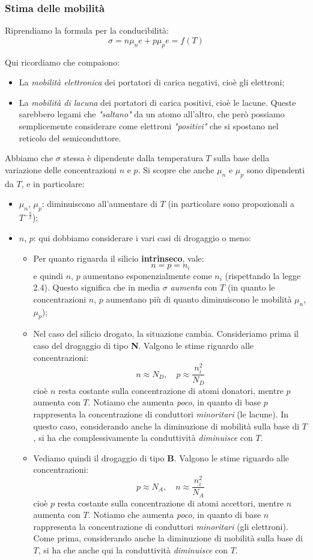 \documentclass[a4paper,11pt]{article}
\begin{document}
\subsubsection{Stima delle mobilità}
Riprendiamo la formula per la conducibilità:
$$
\sigma = n \mu_n e + p \mu_p e = f(T)
$$

Qui ricordiamo che compaiono:
\begin{itemize}
	\item La \textit{mobilità elettronica} dei portatori di carica negativi, cioè gli elettroni;
	\item La \textit{mobilità di lacuna} dei portatori di carica positivi, cioè le lacune. Queste sarebbero legami che \textit{"saltano"} da un atomo all'altro, che però possiamo semplicemente considerare come elettroni \textit{"positivi"} che si spostano nel reticolo del semiconduttore.
\end{itemize}

Abbiamo che $\sigma$ stessa è dipendente dalla temperatura $T$ sulla base della variazione delle concentrazioni $n$ e $p$. Si scopre che anche $\mu_n$ e $\mu_p$ sono dipendenti da $T$, e in particolare:
\begin{itemize}
	\item $\mu_n$, $\mu_p$: diminuiscono all'aumentare di $T$ (in particolare sono propozionali a $T^{-\frac{3}{2}}$);
	\item $n$, $p$: qui dobbiamo considerare i vari casi di drogaggio o meno:
		\begin{itemize}
			\item Per quanto riguarda il silicio \textbf{intrinseco}, vale:
				$$
					n = p = n_i
				$$
				e quindi $n$, $p$ aumentano esponenzialmente come $n_i$ (rispettando la legge 2.4). Questo significa che in media $\sigma$ \textit{aumenta} con $T$ (in quanto le concentrazioni $n$, $p$ aumentano più di quanto diminuiscono le mobilità $\mu_n$, $\mu_p$);
			\item Nel caso del silicio drogato, la situazione cambia. Consideriamo prima il caso del drogaggio di tipo \textbf{N}. Valgono le stime riguardo alle concentrazioni:
				$$
				n \approx N_D, \quad p \approx \frac{n_i^2}{N_D}
				$$
				cioè $n$ resta costante sulla concentrazione di atomi donatori, mentre $p$ aumenta con $T$. Notiamo che aumenta \textit{poco}, in quanto di base $p$ rappresenta la concentrazione di conduttori \textit{minoritari} (le lacune). In questo caso, considerando anche la diminuzione di mobilità sulla base di $T$, si ha che complessivamente la conduttività \textit{diminuisce} con $T$.
			\item Vediamo quindi il drogaggio di tipo \textbf{B}. Valgono le stime riguardo alle concentrazioni:
				$$
				p \approx N_A, \quad n \approx \frac{n_i^2}{N_A}
				$$
				cioè $p$ resta costante sulla concentrazione di atomi accettori, mentre $n$ aumenta con $T$. Notiamo che aumenta \textit{poco}, in quanto di base $n$ rappresenta la concentrazione di conduttori \textit{minoritari} (gli elettroni). Come prima, considerando anche la diminuzione di mobilità sulla base di $T$, si ha che anche qui la conduttività \textit{diminuisce} con $T$. 
		\end{itemize}
\end{itemize}
\end{document}
